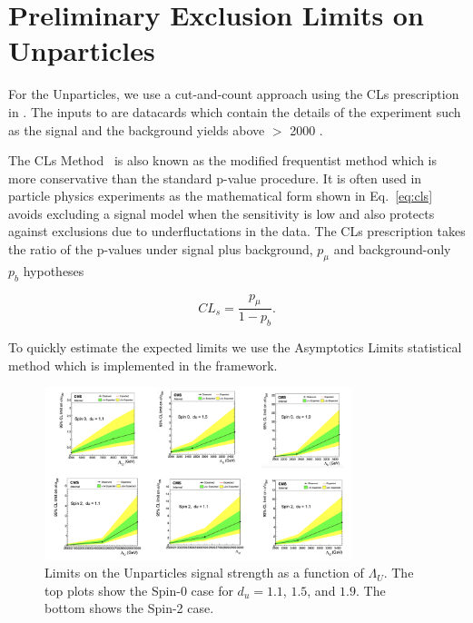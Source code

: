 \section{Preliminary Exclusion Limits on Unparticles}

For the Unparticles, we use a cut-and-count approach using the CLs prescription in \COMBINE. The inputs to \COMBINE are datacards which contain the details of the experiment such as the signal and the background yields above \mgg $>$ 2000 \GeV. 

The CLs Method~\cite{Junk:1999kv, Read:2002hq} is also known as the modified frequentist method which is more conservative than the standard p-value procedure. It is often used in particle physics experiments as the mathematical form shown in Eq.~\ref{eq:cls} avoids excluding a signal model when the sensitivity is low and also protects against exclusions due to underfluctations in the data. The CLs prescription takes the ratio of the p-values under signal plus background, $p_\mu$ and background-only $p_b$ hypotheses

\begin{equation}
\label{eq:cls}
    CL_s = \frac{p_{\mu}}{1-p_b}.
\end{equation}

To quickly estimate the expected limits we use the Asymptotics Limits statistical method which is implemented in the \COMBINE framework. 

\begin{figure}[!htbp]
    \centering
    \includegraphics[angle=0,width=0.8\textwidth]{fig/UnparticlesCountingExperiment.png}
    \caption{Limits on the Unparticles signal strength as a function of $\Lambda_U$. The top plots show the Spin-0 case for $d_u = 1.1$, $1.5$, and $1.9$. The bottom shows the Spin-2 case.}
    \label{fig:UnparLimPlots}
\end{figure}






